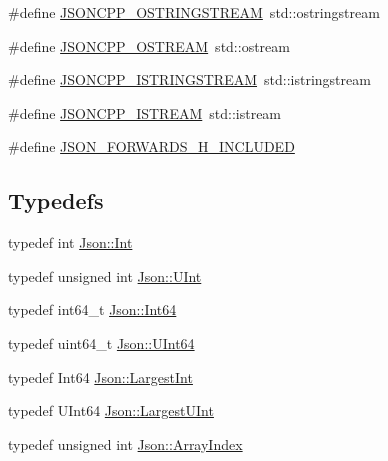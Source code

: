 \begin{DoxyCompactItemize}
\item 
\#define \hyperlink{json-forwards_8h_a1d06ac2ca63c8c521f41231dfda0e6b3_a1d06ac2ca63c8c521f41231dfda0e6b3}{J\+S\+O\+N\+C\+P\+P\+\_\+\+O\+S\+T\+R\+I\+N\+G\+S\+T\+R\+E\+AM}~std\+::ostringstream
\item 
\#define \hyperlink{json-forwards_8h_a37a25be5fca174927780caeb280094ce_a37a25be5fca174927780caeb280094ce}{J\+S\+O\+N\+C\+P\+P\+\_\+\+O\+S\+T\+R\+E\+AM}~std\+::ostream
\item 
\#define \hyperlink{json-forwards_8h_a1b5d70fe3d83273d200193177ded4c25_a1b5d70fe3d83273d200193177ded4c25}{J\+S\+O\+N\+C\+P\+P\+\_\+\+I\+S\+T\+R\+I\+N\+G\+S\+T\+R\+E\+AM}~std\+::istringstream
\item 
\#define \hyperlink{json-forwards_8h_a15f2f70b2ce0a2abd0f8112393dbc4de_a15f2f70b2ce0a2abd0f8112393dbc4de}{J\+S\+O\+N\+C\+P\+P\+\_\+\+I\+S\+T\+R\+E\+AM}~std\+::istream
\item 
\#define \hyperlink{json-forwards_8h_ac320ccec4dca293f3f50f35f7a595f3b_ac320ccec4dca293f3f50f35f7a595f3b}{J\+S\+O\+N\+\_\+\+F\+O\+R\+W\+A\+R\+D\+S\+\_\+\+H\+\_\+\+I\+N\+C\+L\+U\+D\+ED}
\end{DoxyCompactItemize}
\subsection*{Typedefs}
\begin{DoxyCompactItemize}
\item 
typedef int \hyperlink{namespaceJson_a08122e8005b706d982e48cca1e2119c7_a08122e8005b706d982e48cca1e2119c7}{Json\+::\+Int}
\item 
typedef unsigned int \hyperlink{namespaceJson_a800fb90eb6ee8d5d62b600c06f87f7d4_a800fb90eb6ee8d5d62b600c06f87f7d4}{Json\+::\+U\+Int}
\item 
typedef int64\+\_\+t \hyperlink{namespaceJson_ac62566f36fd33115957b91305c9ed1dc_ac62566f36fd33115957b91305c9ed1dc}{Json\+::\+Int64}
\item 
typedef uint64\+\_\+t \hyperlink{namespaceJson_adf3fa5cb60c619e4f02315ad355e0ca1_adf3fa5cb60c619e4f02315ad355e0ca1}{Json\+::\+U\+Int64}
\item 
typedef Int64 \hyperlink{namespaceJson_a218d880af853ce786cd985e82571d297_a218d880af853ce786cd985e82571d297}{Json\+::\+Largest\+Int}
\item 
typedef U\+Int64 \hyperlink{namespaceJson_ae202ecad69725e23443f465e257456d0_ae202ecad69725e23443f465e257456d0}{Json\+::\+Largest\+U\+Int}
\item 
typedef unsigned int \hyperlink{namespaceJson_a8048e741f2177c3b5d9ede4a5b8c53c2_a8048e741f2177c3b5d9ede4a5b8c53c2}{Json\+::\+Array\+Index}
\end{DoxyCompactItemize}


